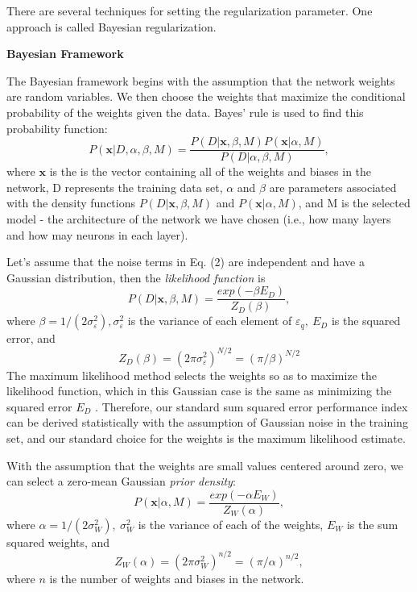 \documentclass[a4paper, 12pt, english, parskip]{scrartcl}
\begin{document}
There are several techniques for setting the regularization parameter. One approach is called Bayesian regularization.

\textbf{Bayesian Framework}

The Bayesian framework begins with the assumption that the network weights are random variables. We then choose the weights that maximize the conditional probability of the weights given the data. Bayes' rule is used to find this probability function:
\begin{equation}
P(\boldsymbol{x} \vert D, \alpha, \beta, M) = \frac{P(D \vert \boldsymbol{x}, \beta, M) P(\boldsymbol{x} \vert \alpha, M)}{P(D \vert \alpha, \beta, M)},
\end{equation}
where $\boldsymbol{x}$ is the is the vector containing all of the weights and biases in the network, D represents the training data set, $\alpha$ and $\beta$ are parameters associated with the density functions $P(D \vert \boldsymbol{x}, \beta, M)$ and $P(\boldsymbol{x} \vert \alpha, M)$, and M is the selected model - the architecture of the network we have chosen (i.e., how many layers and how may neurons in each layer).

Let's assume that the noise terms in Eq. (2) are independent and have a Gaussian distribution, then the \textit{likelihood function} is
\begin{equation}
P(D \vert \boldsymbol{x}, \beta, M) = \frac{exp(-\beta E_D)}{Z_D(\beta)},
\end{equation}
where $\beta = 1 / (2 \sigma_\varepsilon ^ 2 ), \sigma_\varepsilon ^2$ is the variance of each element of $\varepsilon_q,~ E_D$ is the squared error, and 
\begin{equation}
    Z_D(\beta) = (2 \pi \sigma_\varepsilon ^2)^{N / 2} = (\pi / \beta)^{N / 2}
\end{equation}
The maximum likelihood method selects the weights so as
to maximize the likelihood function, which in this
Gaussian case is the same as minimizing the squared
error $E_D$ . Therefore, our standard sum squared error
performance index can be derived statistically with the
assumption of Gaussian noise in the training set, and
our standard choice for the weights is the maximum
likelihood estimate.

With the assumption that the weights are small values centered around zero, we can select a zero-mean Gaussian \textit{prior density}:
\begin{equation}
    P(\boldsymbol{x} \vert \alpha, M) = \frac{exp(-\alpha E_W)}{Z_W(\alpha)},
\end{equation}
where $\alpha = 1 / (2 \sigma_W ^ 2 ), ~\sigma_W ^2$ is the variance of each of the weights, $E_W$ is the sum squared weights, and 
\begin{equation}
    Z_W(\alpha) = (2 \pi \sigma_W ^2)^{n/2} = (\pi / \alpha)^{n / 2},
\end{equation}
where $n$ is the number of weights and biases in the network.
\end{document}
